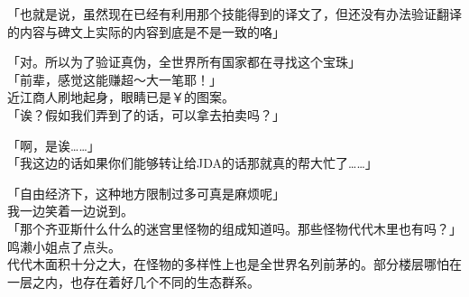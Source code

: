 「也就是说，虽然现在已经有利用那个技能得到的译文了，但还没有办法验证翻译的内容与碑文上实际的内容到底是不是一致的咯」

「对。所以为了验证真伪，全世界所有国家都在寻找这个宝珠」\\

「前辈，感觉这能赚超～大一笔耶！」\\

近江商人刷地起身，眼睛已是￥的图案。\\

「诶？假如我们弄到了的话，可以拿去拍卖吗？」

「啊，是诶……」\\

「我这边的话如果你们能够转让给JDA的话那就真的帮大忙了……」

「自由经济下，这种地方限制过多可真是麻烦呢」\\

我一边笑着一边说到。\\

「那个齐亚斯什么什么的迷宫里怪物的组成知道吗。那些怪物代代木里也有吗？」\\

鸣濑小姐点了点头。\\

代代木面积十分之大，在怪物的多样性上也是全世界名列前茅的。部分楼层哪怕在一层之内，也存在着好几个不同的生态群系。

